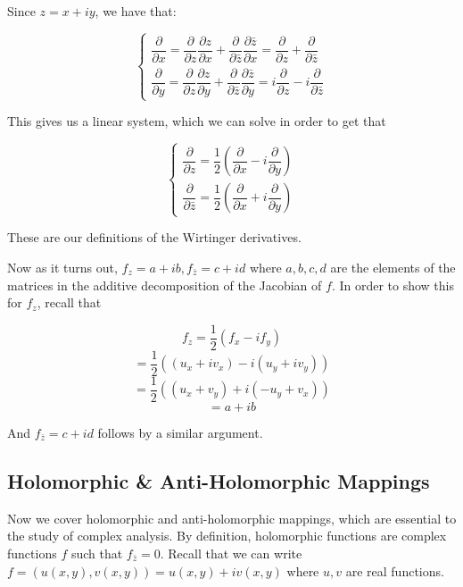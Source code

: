 Since $z = x + iy$, we have that:

$$\begin{cases}
\dfrac{\partial}{\partial x} = \dfrac{\partial}{\partial z} \dfrac{\partial z}{\partial x} + \dfrac{\partial}{\partial \bar{z}} \dfrac{\partial \bar{z}}{\partial x} = \dfrac{\partial}{\partial z} + \dfrac{\partial}{\partial \bar{z}} \\

\dfrac{\partial}{\partial y} = \dfrac{\partial }{\partial z} \dfrac{\partial z}{\partial y} + \dfrac{\partial}{\partial \bar{z}} \dfrac{\partial \bar{z}}{\partial y} = i \dfrac{\partial}{\partial z} - i \dfrac{\partial}{\partial \bar{z}}
\end{cases}$$

This gives us a linear system, which we can solve in order to get that

$$\begin{cases}
\dfrac{\partial}{\partial z} = \dfrac{1}{2} \left( \dfrac{\partial}{\partial x} - i \dfrac{\partial}{\partial y} \right) \\

\dfrac{\partial}{\partial \bar{z}} = \dfrac{1}{2} \left( \dfrac{\partial}{\partial x} + i \dfrac{\partial}{\partial y} \right)
\end{cases}$$

These are our definitions of the Wirtinger derivatives.

Now as it turns out, $f_z = a + ib, f_{\bar{z}} = c + id$ where $a,b,c,d$ are the elements of the matrices in the additive decomposition of the Jacobian of $f$. In order to show this for $f_z$, recall that 

$$f_z = \frac{1}{2} \left( f_x - i f_y \right)$$
$$ = \frac{1}{2} \left( (u_x + i v_x) - i (u_y + i v_y) \right)$$
$$ = \frac{1}{2} \left( (u_x + v_y) + i ( - u_y + v_x ) \right) $$
$$ = a + ib$$

And $f_{\bar{z}} = c + id$ follows by a similar argument.


\subsection{Holomorphic \& Anti-Holomorphic Mappings}

Now we cover holomorphic and anti-holomorphic mappings, which are essential to the study of complex analysis. By definition, holomorphic functions are complex functions $f$ such that $f_{\bar{z}} = 0$. Recall that we can write $f = (u(x,y), v(x,y)) = u(x,y) + i v(x,y)$ where $u,v$ are real functions.

